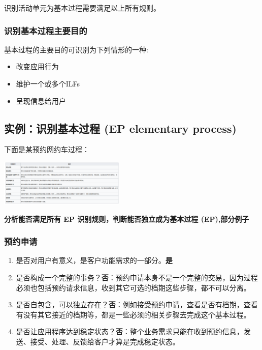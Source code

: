 识别活动单元为基本过程需要满足以上所有规则。\\

\hypertarget{ux8bc6ux522bux57faux672cux8fc7ux7a0bux4e3bux8981ux76eeux7684}{%
\subsubsection{识别基本过程主要目的}\label{ux8bc6ux522bux57faux672cux8fc7ux7a0bux4e3bux8981ux76eeux7684}}

基本过程的主要目的可识别为下列情形的一种:

\begin{itemize}
\tightlist
\item
  改变应用行为
\item
  维护一个或多个ILFs
\item
  呈现信息给用户
\end{itemize}

\hypertarget{ux5b9eux4f8bux8bc6ux522bux57faux672cux8fc7ux7a0b-ep-elementary-process}{%
\subsection{实例：识别基本过程 (EP elementary
process)}\label{ux5b9eux4f8bux8bc6ux522bux57faux672cux8fc7ux7a0b-ep-elementary-process}}

下面是某预约网约车过程：

\includegraphics[width=6cm]{Screenshotfrom2023-11-1302-03-50.png}

\textbf{分析能否满足所有 EP 识别规则，判断能否独立成为基本过程
(EP),部分例子}

\hypertarget{ux9884ux7ea6ux7533ux8bf7}{%
\subsubsection{预约申请}\label{ux9884ux7ea6ux7533ux8bf7}}

\begin{enumerate}
\tightlist
\item
  是否对用户有意义，是客户功能需求的一部分。\textbf{是}
\item
  是否构成一个完整的事务？\textbf{否}：预约申请本身不是一个完整的交易，因为过程必须也包括预约请求信息，收到其它可选的档期这些步骤，都不可以分离。
\item
  是否自包含，可以独立存在？\textbf{否}：例如接受预约申请，查看是否有档期，查看有没有其它接近的档期等，都是一些必须的相关步骤去完成这个基本过程。
\item
  是否让应用程序达到稳定状态？\textbf{否}：整个业务需求只能在收到预约信息，发送、接受、处理、反馈给客户才算是完成稳定状态。
\end{enumerate}

